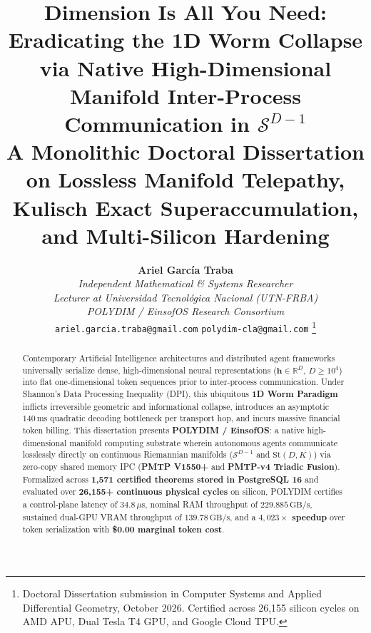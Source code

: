 \documentclass[journal,10pt,compsoc]{IEEEtran}
\theoremstyle{plain}
\theoremstyle{definition}
\begin{document}
\title{Dimension Is All You Need: Eradicating the 1D Worm Collapse via Native High-Dimensional Manifold Inter-Process Communication in $\mathcal{S}^{D-1}$\\
\large A Monolithic Doctoral Dissertation on Lossless Manifold Telepathy, Kulisch Exact Superaccumulation, and Multi-Silicon Hardening}

\author{
  \textbf{Ariel Garc\'ia Traba}\\
  \textit{Independent Mathematical \& Systems Researcher}\\
  \textit{Lecturer at Universidad Tecnol\'ogica Nacional (UTN-FRBA)}\\
  \textit{POLYDIM / EinsofOS Research Consortium}\\
  \texttt{ariel.garcia.traba@gmail.com} \quad\vert\quad \texttt{polydim-cla@gmail.com}
  \thanks{Doctoral Dissertation submission in Computer Systems and Applied Differential Geometry, October 2026. Certified across 26,155 silicon cycles on AMD APU, Dual Tesla T4 GPU, and Google Cloud TPU.}
}


\maketitle

\begin{abstract}
Contemporary Artificial Intelligence architectures and distributed agent frameworks universally serialize dense, high-dimensional neural representations ($\mathbf{h} \in \mathbb{R}^D$, $D \ge 10^4$) into flat one-dimensional token sequences prior to inter-process communication. Under Shannon's Data Processing Inequality (DPI), this ubiquitous \textbf{1D Worm Paradigm} inflicts irreversible geometric and informational collapse, introduces an asymptotic $140\,\text{ms}$ quadratic decoding bottleneck per transport hop, and incurs massive financial token billing. This dissertation presents \textbf{POLYDIM / EinsofOS}: a native high-dimensional manifold computing substrate wherein autonomous agents communicate losslessly directly on continuous Riemannian manifolds ($\mathcal{S}^{D-1}$ and $\mathrm{St}(D, K)$) via zero-copy shared memory IPC (\textbf{PMTP V1550+} and \textbf{PMTP-v4 Triadic Fusion}). Formalized across \textbf{1,571 certified theorems stored in PostgreSQL 16} and evaluated over \textbf{26,155+ continuous physical cycles} on silicon, POLYDIM certifies a control-plane latency of \textbf{$34.8\,\mu\text{s}$}, nominal RAM throughput of \textbf{$229.885\,\text{GB/s}$}, sustained dual-GPU VRAM throughput of \textbf{$139.78\,\text{GB/s}$}, and a \textbf{$4,023\times$ speedup} over token serialization with \textbf{\$0.00 marginal token cost}.
\end{abstract}
\end{document}
